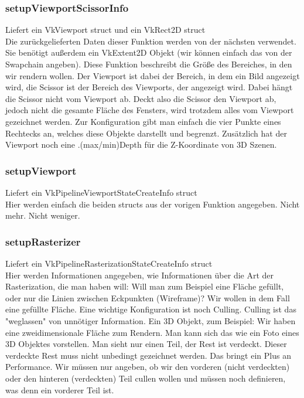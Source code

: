 \documentclass[11pt,a4paper]{report}
\begin{document}
\subsubsection{setupViewportScissorInfo}
Liefert ein VkViewport struct und ein VkRect2D struct\\
Die zurückgelieferten Daten dieser Funktion werden von der nächsten verwendet. Sie benötigt außerdem ein VkExtent2D Objekt (wir können einfach das von der Swapchain angeben). Diese Funktion beschreibt die Größe des Bereiches, in den wir rendern wollen. Der Viewport ist dabei der Bereich, in dem ein Bild angezeigt wird, die Scissor ist der Bereich des Viewports, der angezeigt wird. Dabei hängt die Scissor nicht vom Viewport ab. Deckt also die Scissor den Viewport ab, jedoch nicht die gesamte Fläche des Fensters, wird trotzdem alles vom Viewport gezeichnet werden. Zur Konfiguration gibt man einfach die vier Punkte eines Rechtecks an, welches diese Objekte darstellt und begrenzt. Zusätzlich hat der Viewport noch eine .(max/min)Depth für die Z-Koordinate von 3D Szenen.

\subsubsection{setupViewport}
Liefert ein VkPipelineViewportStateCreateInfo struct\\
Hier werden einfach die beiden structs aus der vorigen Funktion angegeben. Nicht mehr. Nicht weniger.

\subsubsection{setupRasterizer}
Liefert ein VkPipelineRasterizationStateCreateInfo struct\\
Hier werden Informationen angegeben, wie Informationen über die Art der Rasterization, die man haben will: Will man zum Beispiel eine Fläche gefüllt, oder nur die Linien zwischen Eckpunkten (Wireframe)? Wir wollen in dem Fall eine gefüllte Fläche. Eine wichtige Konfiguration ist noch Culling. Culling ist das "weglassen" von unnötiger Information. Ein 3D Objekt, zum Beispiel: Wir haben eine zweidimensionale Fläche zum Rendern. Man kann sich das wie ein Foto eines 3D Objektes vorstellen. Man sieht nur einen Teil, der Rest ist verdeckt. Dieser verdeckte Rest muss nicht unbedingt gezeichnet werden. Das bringt ein Plus an Performance. Wir müssen nur angeben, ob wir den vorderen (nicht verdeckten) oder den hinteren (verdeckten) Teil cullen wollen und müssen noch definieren, was denn ein vorderer Teil ist.
\end{document}

